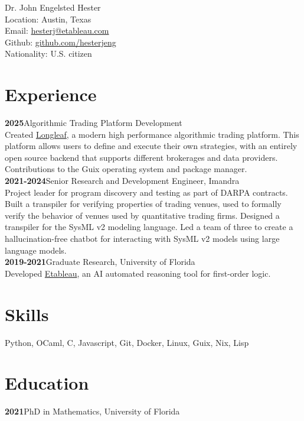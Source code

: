 \documentclass[10pt, letterpaper]{article}
\newcommand{\years}[1]{\textbf{#1}\hspace{1em}}
\begin{document}
{\LARGE Dr. John Engelsted Hester}\\[0.3cm]
Location: Austin, Texas\\
Email: \href{mailto:hesterj@etableau.com}{hesterj@etableau.com}\\
Github: \href{https://github.com/hesterjeng}{github.com/hesterjeng}\\
Nationality:  U.S. citizen

\section*{Experience}
\noindent
\years{2025}Algorithmic Trading Platform Development\\
Created \href{https://github.com/hesterjeng/longleaf}{Longleaf}, a modern high performance algorithmic trading platform.  This platform allows users to define and execute their own strategies, with an entirely open source backend that supports different brokerages and data providers.  Contributions to the Guix operating system and package manager.\\

\years{2021-2024}Senior Research and Development Engineer, Imandra\\
Project leader for program discovery and testing as part of DARPA contracts. Built a transpiler for verifying properties of trading venues, used to formally verify the behavior of venues used by quantitative trading firms. Designed a transpiler for the SysML v2 modeling language. Led a team of three to create a hallucination-free chatbot for interacting with SysML v2 models using large language models.\\

\years{2019-2021}Graduate Research, University of Florida\\
Developed \href{https://github.com/hesterj/Etableau}{Etableau}, an AI automated reasoning tool for first-order logic.

\section*{Skills}
Python, OCaml, C, Javascript, Git, Docker, Linux, Guix, Nix, Lisp

\section*{Education}
\noindent
\years{2021}PhD in Mathematics, University of Florida\\
\end{document}
